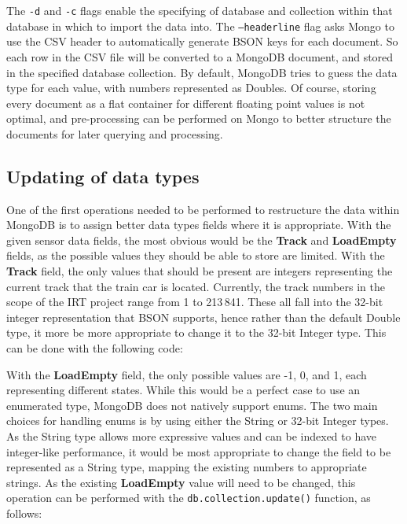 \documentclass[a4paper,11pt]{article}
\begin{document}

The \texttt{-d} and \texttt{-c} flags enable the specifying of database and collection within that database in which to
import the data into. The \texttt{--headerline} flag asks Mongo to use the CSV header to automatically generate BSON
keys for each document. So each row in the CSV file will be converted to a MongoDB document, and stored in the specified
database collection. By default, MongoDB tries to guess the data type for each value, with numbers represented as Doubles.
Of course, storing every document as a flat container for different floating point values is not optimal, and pre-processing
can be performed on Mongo to better structure the documents for later querying and processing.



\subsection{Updating of data types} %
\label{sub:restructuring_of_data}

One of the first operations needed to be performed to restructure the data within MongoDB is to assign better data types
fields where it is appropriate. With the given sensor data fields, the most obvious would be the \textbf{Track} and
\textbf{LoadEmpty} fields, as the possible values they should be able to store are limited. With the \textbf{Track} field,
the only values that should be present are integers representing the current track that the train car is located. Currently,
the track numbers in the scope of the IRT project range from 1 to 213\,841. These all fall into the 32-bit integer representation
that BSON supports, hence rather than the default Double type, it more be more appropriate to change it to the 32-bit Integer
type. This can be done with the following code:


With the \textbf{LoadEmpty} field, the only possible values are -1, 0, and 1, each representing different states. While
this would be a perfect case to use an enumerated type, MongoDB does not natively support enums. The two main choices
for handling enums is by using either the String or 32-bit Integer types. As the String type allows more expressive
values and can be indexed to have integer-like performance, it would be most appropriate to change the field to be
represented as a String type, mapping the existing numbers to appropriate strings. As the existing \textbf{LoadEmpty}
value will need to be changed, this operation can be performed with the \texttt{db.collection.update()} function, as
follows:
\end{document}
